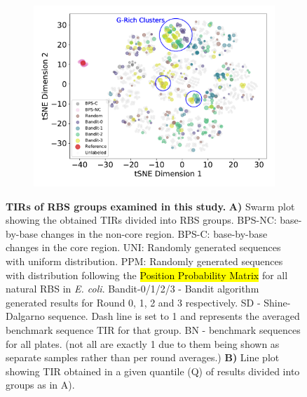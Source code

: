 \documentclass{article}
\begin{document}
\begin{figure}[!ht]
\begin{subfigure}[b]{0.48\textwidth}
    \end{subfigure}
    \begin{subfigure}[b]{0.48\textwidth}
        \centering
        \caption{}
        \includegraphics[scale=0.42]{plots/Main_Paper/tsneplot.pdf}
    \end{subfigure}
    \caption{
    \textbf{TIRs of RBS groups examined in this study.}
    \textbf{A)} Swarm plot showing the obtained TIRs divided into RBS groups.
    BPS-NC: base-by-base changes in the non-core region.
    BPS-C: base-by-base changes in the core region.
    UNI: Randomly generated sequences with uniform distribution.
    PPM: Randomly generated sequences with distribution following the \hl{Position Probability Matrix} for all natural RBS in \emph{E. coli}.
    Bandit-0/1/2/3 - Bandit algorithm generated results for Round 0, 1, 2 and 3 respectively.
    SD - Shine-Dalgarno sequence.
    Dash line is set to 1 and represents the averaged benchmark sequence TIR for that group.
    BN - benchmark sequences for all plates.
    (not all are exactly 1 due to them being shown as separate samples rather than per round averages.)
    \textbf{B)} Line plot showing TIR obtained in a given quantile (Q) of results divided into groups as in A).
}
\end{figure}
\end{document}
